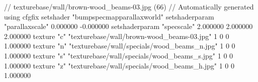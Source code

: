 // texturebase/wall/brown-wood_beams-03.jpg (66)
// Automatically generated using cfgfix
setshader "bumpspecmapparallaxworld"
setshaderparam "parallaxscale" 0.000000 -0.000000
setshaderparam "specscale" 2.000000 2.000000 2.000000
texture "c" "texturebase/wall/brown-wood_beams-03.jpg" 1 0 0 1.000000
texture "n" "texturebase/wall/specials/wood_beams_n.jpg" 1 0 0 1.000000
texture "s" "texturebase/wall/specials/wood_beams_s.jpg" 1 0 0 1.000000
texture "z" "texturebase/wall/specials/wood_beams_h.jpg" 1 0 0 1.000000

